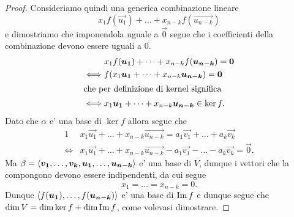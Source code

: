 \begin{proof}
    Consideriamo quindi una generica combinazione lineare \[
        x_1f(\vec{u_1}) + \dots + x_{n-k}f(\vec{u_{n-k}})
    \] e dimostriamo che imponendola uguale a $\vec 0$ segue che i coefficienti della combinazione devono essere uguali a 0.
    \begin{alignat*}
        {1}
        &x_1f(\vec{u_1}) + \dots + x_{n-k}f(\vec{u_{n-k}}) = \vec 0 \\
        \iff &f(x_1\vec{u_1} + \dots + x_{n-k}\vec{u_{n-k}}) = \vec 0 \\
        \intertext{che per definizione di kernel significa}
        \iff &x_1\vec{u_1} + \dots + x_{n-k}\vec{u_{n-k}} \in \ker f.
    \end{alignat*}
    Dato che $\alpha$ e' una base di $\ker f$ allora segue che
    \begin{alignat*}{1}
        &x_1\vec{u_1} + \dots + x_{n-k}\vec{u_{n-k}} = a_1\vec{v_1} + \dots + a_k\vec{v_k} \\
        \iff &x_1\vec{u_1} + \dots + x_{n-k}\vec{u_{n-k}} - a_1\vec{v_1} - \dots - a_k\vec{v_k} = \vec 0.
    \end{alignat*}
    Ma $\beta = \basis{\vec{v_1}, \dots, \vec{v_k}, \vec{u_1}, \dots, \vec{u_{n-k}}}$ e' una base di $V$, dunque i vettori che la compongono devono essere indipendenti, da cui segue \[
        x_1 = \dots = x_{n-k} = 0.   
    \]
    Dunque $\basis{f(\vec{u_1}), \dots, f(\vec{u_{n-k}})}$ e' una base di $\Imm{f}$ e dunque segue che $\dim V = \dim \ker f + \dim \Imm{f}$, come volevasi dimostrare.
\end{proof}

